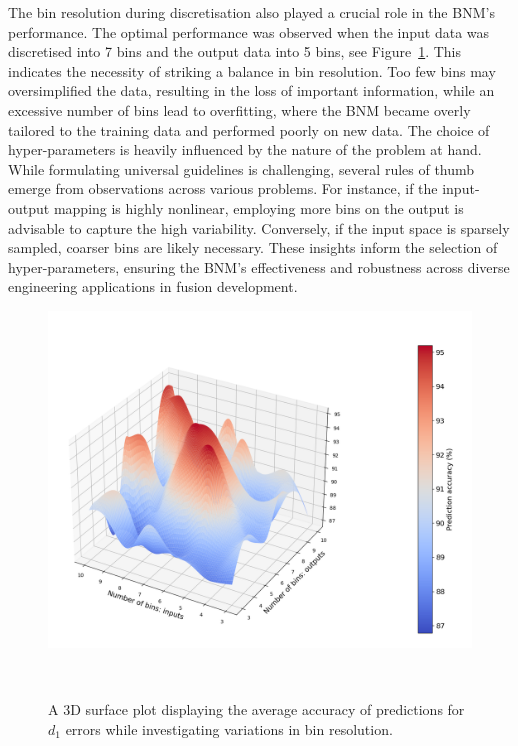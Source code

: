 \documentclass[journal]{IEEEtran}
\begin{document}
The bin resolution during discretisation also played a crucial role in the BNM's performance. The optimal performance was observed when the input data was discretised into 7 bins and the output data into 5 bins, see Figure~\ref{fig:3D_SA_trimmed_39_D1}. This indicates the necessity of striking a balance in bin resolution. Too few bins may oversimplified the data, resulting in the loss of important information, while an excessive number of bins lead to overfitting, where the BNM became overly tailored to the training data and performed poorly on new data. The choice of hyper-parameters is heavily influenced by the nature of the problem at hand. While formulating universal guidelines is challenging, several rules of thumb emerge from observations across various problems. For instance, if the input-output mapping is highly nonlinear, employing more bins on the output is advisable to capture the high variability. Conversely, if the input space is sparsely sampled, coarser bins are likely necessary. These insights inform the selection of hyper-parameters, ensuring the BNM's effectiveness and robustness across diverse engineering applications in fusion development.

\begin{figure}[t]
    \centering
    \includegraphics[width=\columnwidth]{figures/validation_plots/PROCESS/SA_process_3D.png}
    \caption{\small A 3D surface plot displaying the average accuracy of predictions for $d_{1}$ errors while investigating variations in bin resolution.}~\label{fig:3D_SA_trimmed_39_D1}
\end{figure}
\end{document}
